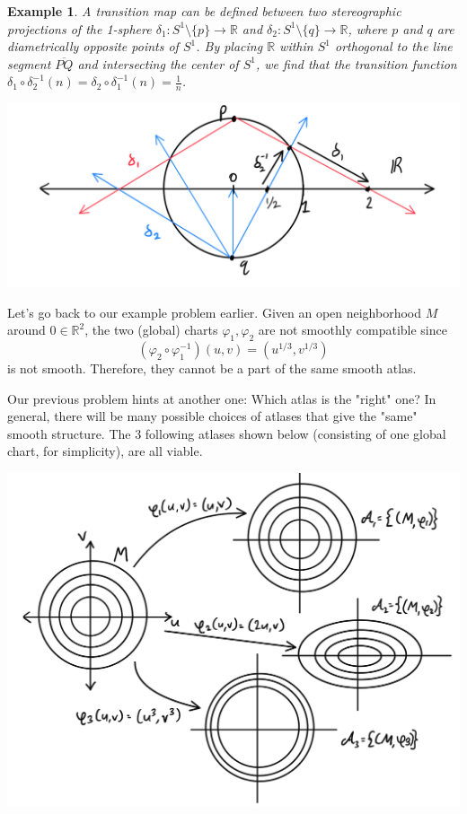 \documentclass{article}
\newtheorem{example}{Example}[section]
\theoremstyle{remark}
\theoremstyle{definition}
\begin{document}
    \begin{example}
      A transition map can be defined between two stereographic projections of the 1-sphere $\delta_{1}: S^{1} \setminus{\{p\}} \longrightarrow \mathbb{R}$ and $\delta_{2}: S^{1} \setminus{\{q\}} \longrightarrow \mathbb{R}$, where $p$ and $q$ are diametrically opposite points of $S^{1}$. By placing $\mathbb{R}$ within $S^{1}$ orthogonal to the line segment $\overline{PQ}$ and intersecting the center of $S^{1}$, we find that the transition function $\delta_{1} \circ \delta_{2}^{-1}(n) = \delta_{2} \circ \delta_{1}^{-1}(n) = \frac{1}{n}$.  
      \begin{center}
        \includegraphics[scale=0.25]{img/1_dim_projection_transition_function.PNG}
      \end{center}
    \end{example}

    Let's go back to our example problem earlier. Given an open neighborhood $M$ around $0 \in \mathbb{R}^2$, the two (global) charts $\varphi_1, \varphi_2$ are not smoothly compatible since 
      \[(\varphi_2 \circ \varphi_1^{-1})(u, v) = (u^{1/3}, v^{1/3})\]
    is not smooth. Therefore, they cannot be a part of the same smooth atlas. 

    Our previous problem hints at another one: Which atlas is the "right" one? In general, there will be many possible choices of atlases that give the "same" smooth structure. The 3 following atlases shown below (consisting of one global chart, for simplicity), are all viable. 

    \begin{center}
      \includegraphics[scale=0.32]{img/Different_Atlases.PNG}
    \end{center}
\end{document}

